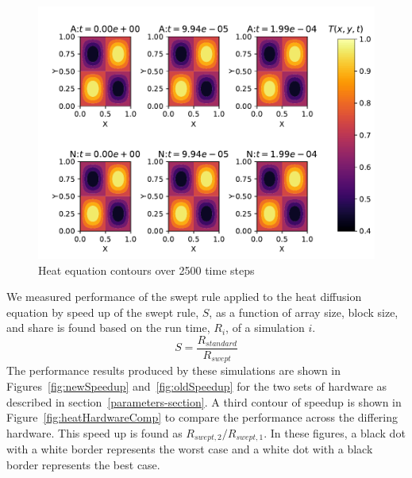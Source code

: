 \documentclass[review]{elsarticle}
\begin{document}
\begin{figure}[htb!]
    \centering
    \includegraphics{figs/heatValidate.pdf}
    \caption{Heat equation contours over 2500 time steps}
    \label{fig:heatSurface}
\end{figure}

We measured performance of the swept rule applied to the heat diffusion equation by speed up of the swept rule, $S$, as a function of array size, block size, and share is found based on the run time, $R_i$, of a simulation $i$. 
\begin{equation}
    S = \frac{R_{standard}}{R_{swept}}
\end{equation}
The performance results produced by these simulations are shown in Figures~\ref{fig:newSpeedup} and~\ref{fig:oldSpeedup} for the two sets of hardware as described in section~\ref{parameters-section}. 
A third contour of speedup is shown in Figure~\ref{fig:heatHardwareComp} to compare the performance across  the differing hardware. This speed up is found as $R_{swept,2}/R_{swept,1}$. In these figures, a black dot with a white border represents the worst case and a white dot with a black border represents the best case.
\end{document}
